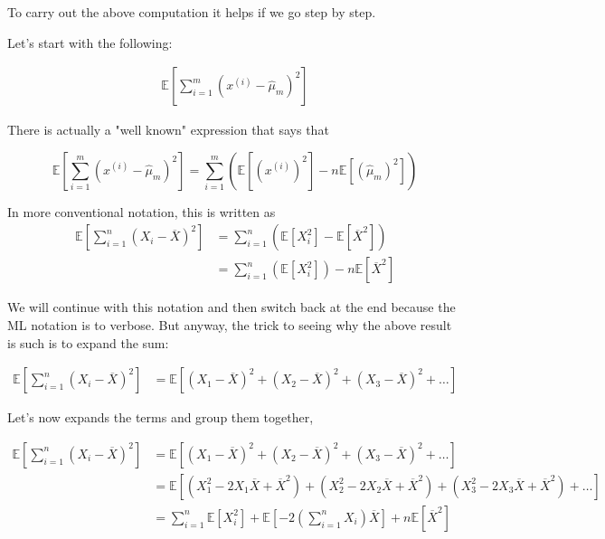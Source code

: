 To carry out the above computation it helps if we go step by step.

Let's start with the following:

\begin{align*}
\mathbb{E} \left[ \sum_{i=1}^{m} \left( x^{(i)} - \hat{\mu}_m \right)^2 \right]
\end{align*}

There is actually a "well known" expression that says that

$$
\mathbb{E} \left[ \sum_{i=1}^{m} \left( x^{(i)} - \hat{\mu}_m \right)^2 \right]
= \sum_{i=1}^{m} \left(
    \mathbb{E}\left[ \left( x^{(i)} \right)^2 \right]
    - n \mathbb{E}\left[ \left(\hat{\mu}_m  \right)^2 \right]
\right)
$$

In more conventional notation, this is written as
\begin{align*}
\mathbb{E} \left[ \sum_{i=1}^{n} \left( X_i - \overline{X} \right)^2 \right]
&= \sum_{i=1}^{n} \left( \mathbb{E}\left[ X_{i}^{2} \right] - \mathbb{E}\left[ \overline{X}^2 \right] \right) \\
&= \sum_{i=1}^{n} \left( \mathbb{E}\left[ X_{i}^{2} \right] \right)
    -n \mathbb{E}\left[ \overline{X}^2 \right]
\end{align*}

We will continue with this notation and then switch back at the end because the ML notation is to verbose.
But anyway, the trick to seeing why the above result is such is to expand the sum:

\begin{align*}
\mathbb{E} \left[ \sum_{i=1}^{n} \left( X_i - \overline{X} \right)^2 \right]
    &= \mathbb{E}\left[ \left(X_1 - \overline{X}\right)^2 + \left(X_2 - \overline{X}\right)^2 + \left(X_3 - \overline{X}\right)^2 + \dots \right]
\end{align*}

Let's now expands the terms and group them together,

\begin{align*}
\mathbb{E} \left[ \sum_{i=1}^{n} \left( X_i - \overline{X} \right)^2 \right]
    &= \mathbb{E}\left[ \left(X_1 - \overline{X}\right)^2 + \left(X_2 - \overline{X}\right)^2 + \left(X_3 - \overline{X}\right)^2 + \dots \right] \\
&= \mathbb{E} \left[ \left(X_{1}^{2} -2X_1 \overline{X} + \overline{X}^2 \right) + \left(X_{2}^{2} -2X_2 \overline{X} + \overline{X}^2 \right) + \left(X_{3}^{2} -2X_3 \overline{X} + \overline{X}^2 \right) + \dots\right] \\
&= \sum_{i=1}^{n} \mathbb{E}\left[ X_{i}^2 \right]
    + \mathbb{E}\left[ -2 \left( \sum_{i=1}^{n} X_i \right) \overline{X} \right] 
    + n \mathbb{E}\left[ \overline{X}^2 \right]
\end{align*}

